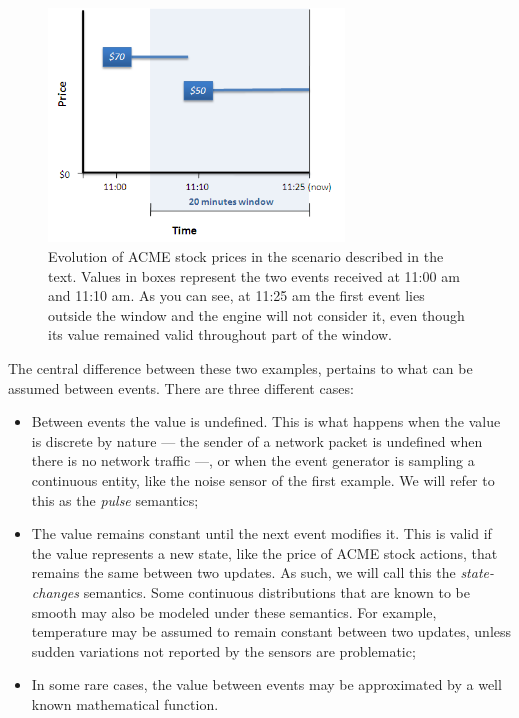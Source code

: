 \begin{figure}[h]
  \center
  \includegraphics[width=0.7\textwidth]{outside-window.png}
  \caption{Evolution of ACME stock prices in the scenario described in
    the text. Values in boxes represent the two events received at
    11:00 am and 11:10 am. As you can see, at 11:25 am the first event
    lies outside the window and the engine will not consider it, even
    though its value remained valid throughout part of the window.}
  \label{fig:outside-window}
\end{figure}


The central difference between these two examples, pertains to what
can be assumed between events. There are three different cases:

\begin{itemize}
\item Between events the value is undefined. This is what happens when
  the value is discrete by nature --- the sender of a network packet
  is undefined when there is no network traffic ---, or when the event
  generator is sampling a continuous entity, like the noise sensor of
  the first example. We will refer to this as the \emph{pulse}
  semantics;
\item The value remains constant until the next event modifies
  it. This is valid if the value represents a new state, like the
  price of ACME stock actions, that remains the same between two
  updates. As such, we will call this the \emph{state-changes}
  semantics. Some continuous distributions that are known to be smooth
  may also be modeled under these semantics. For example, temperature
  may be assumed to remain constant between two updates, unless sudden
  variations not reported by the sensors are problematic;
\item In some rare cases, the value between events may be approximated
  by a well known mathematical function.
\end{itemize}


